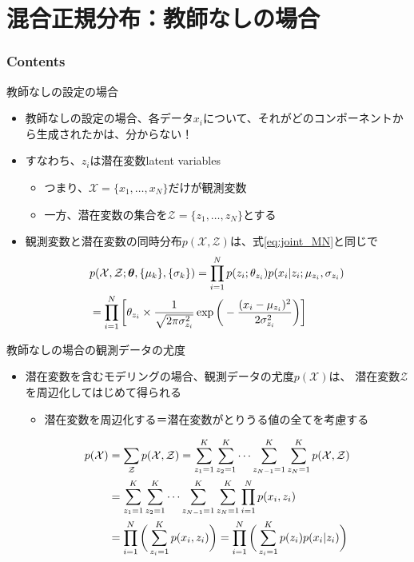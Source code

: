 \documentclass[aspectratio=169,unicode,dvipdfmx,14pt]{beamer}
\begin{document}
\section{混合正規分布：教師なしの場合}

\begin{frame}\frametitle{Contents}
\Large \tableofcontents[currentsection]
\end{frame}


\begin{frame}{教師なしの設定の場合}
\vspace{-.05in}
\begin{itemize}
\item 教師なしの設定の場合、各データ$x_i$について、それがどのコンポーネントから生成されたかは、分からない！
\item すなわち、$z_i$は潜在変数latent variables
\begin{itemize}
\item つまり、$\mathcal{X} = \{ x_1, \ldots, x_N \}$だけが観測変数
\item 一方、潜在変数の集合を$\mathcal{Z} = \{ z_1, \ldots, z_N \}$とする
\end{itemize}
\item 観測変数と潜在変数の同時分布$p(\mathcal{X}, \mathcal{Z})$は、式\eqref{eq:joint_MN}と同じで
\vspace{-.13in}
\begin{align}
& p(\mathcal{X}, \mathcal{Z};\bm{\theta},\{ \mu_k \}, \{ \sigma_k \})
= \prod_{i=1}^N p(z_i ; \theta_{z_i}) p(x_i | z_i ; \mu_{z_i}, \sigma_{z_i})
\notag \\ &
= \prod_{i=1}^N \bigg[ \theta_{z_i} \times \frac{1}{\sqrt{2\pi\sigma_{z_i}^2}}\exp\bigg( - \frac{(x_i - \mu_{z_i})^2}{2\sigma_{z_i}^2} \bigg) \bigg]
\notag
\end{align}
\end{itemize}
\end{frame}

\begin{frame}{教師なしの場合の観測データの尤度}
\begin{itemize}
\item 潜在変数を含むモデリングの場合、観測データの尤度$p(\mathcal{X})$は、
潜在変数$\mathcal{Z}$を周辺化してはじめて得られる
\begin{itemize}
\item 潜在変数を周辺化する＝潜在変数がとりうる値の全てを考慮する
\end{itemize}
\begin{align}
p(\mathcal{X}) & = \sum_{\mathcal{Z}} p(\mathcal{X}, \mathcal{Z})
= \sum_{z_1=1}^K \sum_{z_2=1}^K \cdots \sum_{z_{N-1}=1}^K \sum_{z_N=1}^K p(\mathcal{X}, \mathcal{Z})
\notag \\ &
= \sum_{z_1=1}^K \sum_{z_2=1}^K \cdots \sum_{z_{N-1}=1}^K \sum_{z_N=1}^K \prod_{i=1}^N p(x_i, z_i)
\notag \\ &
= \prod_{i=1}^N \bigg( \sum_{z_i=1}^K p(x_i , z_i) \bigg)
= \prod_{i=1}^N \bigg( \sum_{z_i=1}^K p(z_i) p(x_i | z_i) \bigg)
\label{eq:LH_mixture}
\end{align}
\end{itemize}
\end{frame}
\end{document}
